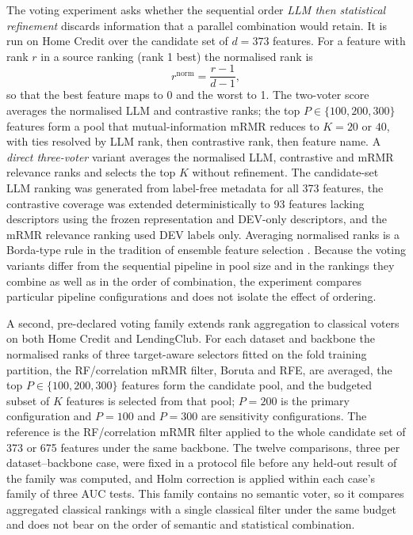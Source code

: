 \documentclass[final,5p,twocolumn]{elsarticle}
\newcommand{\Kfeat}{K}
\begin{document}
The voting experiment asks whether the sequential order \emph{LLM then statistical refinement} discards information that a parallel combination would retain. It is run on Home Credit over the candidate set of $d=373$ features. For a feature with rank $r$ in a source ranking (rank 1 best) the normalised rank is
\begin{equation}
    r^{\mathrm{norm}}=\frac{r-1}{d-1},
    \label{eq:normrank}
\end{equation}
so that the best feature maps to 0 and the worst to 1. The two-voter score averages the normalised LLM and contrastive ranks; the top $P\in\{100,200,300\}$ features form a pool that mutual-information mRMR reduces to $\Kfeat=20$ or $40$, with ties resolved by LLM rank, then contrastive rank, then feature name. A \emph{direct three-voter} variant averages the normalised LLM, contrastive and mRMR relevance ranks and selects the top $\Kfeat$ without refinement. The candidate-set LLM ranking was generated from label-free metadata for all 373 features, the contrastive coverage was extended deterministically to 93 features lacking descriptors using the frozen representation and DEV-only descriptors, and the mRMR relevance ranking used DEV labels only. Averaging normalised ranks is a Borda-type rule \cite{dwork2001} in the tradition of ensemble feature selection \cite{saeys2008}. Because the voting variants differ from the sequential pipeline in pool size and in the rankings they combine as well as in the order of combination, the experiment compares particular pipeline configurations and does not isolate the effect of ordering.

A second, pre-declared voting family extends rank aggregation to classical voters on both Home Credit and LendingClub. For each dataset and backbone the normalised ranks of three target-aware selectors fitted on the fold training partition, the RF/correlation mRMR filter, Boruta and RFE, are averaged, the top $P\in\{100,200,300\}$ features form the candidate pool, and the budgeted subset of $\Kfeat$ features is selected from that pool; $P=200$ is the primary configuration and $P=100$ and $P=300$ are sensitivity configurations. The reference is the RF/correlation mRMR filter applied to the whole candidate set of 373 or 675 features under the same backbone. The twelve comparisons, three per dataset--backbone case, were fixed in a protocol file before any held-out result of the family was computed, and Holm correction is applied within each case's family of three AUC tests. This family contains no semantic voter, so it compares aggregated classical rankings with a single classical filter under the same budget and does not bear on the order of semantic and statistical combination.
\end{document}
